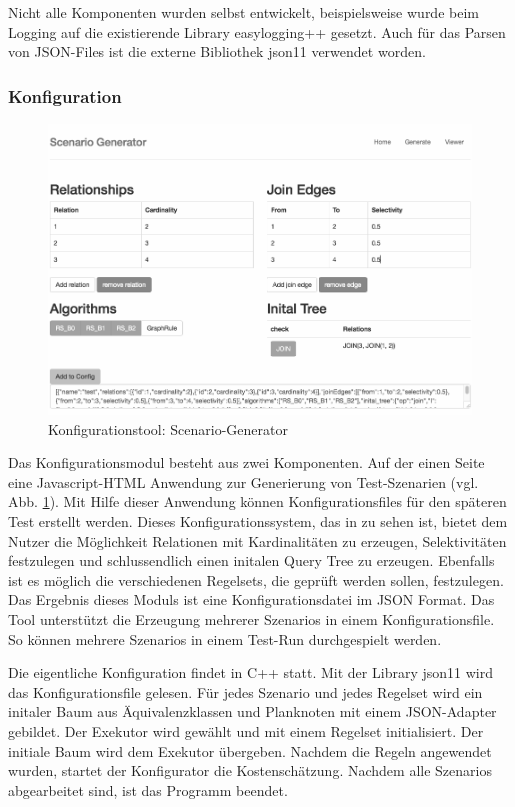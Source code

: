 Nicht alle Komponenten wurden selbst entwickelt, beispielsweise wurde beim Logging auf die existierende Library easylogging++ gesetzt. Auch für das Parsen von JSON-Files ist die externe Bibliothek json11 verwendet worden. 

\subsubsection{Konfiguration}


\begin{figure}[ht]
  \centering
  \includegraphics[width=1\textwidth]{04_Implementierung/Tool.png}
  \caption{Konfigurationstool: Scenario-Generator}
  \label{ScenarioGenerator}
\end{figure}

Das Konfigurationsmodul besteht aus zwei Komponenten. Auf der einen Seite eine Javascript-HTML Anwendung zur Generierung von Test-Szenarien (vgl. Abb. \ref{ScenarioGenerator}). Mit Hilfe dieser Anwendung können Konfigurationsfiles für den späteren Test erstellt werden. Dieses Konfigurationssystem, das in  zu sehen ist, bietet dem Nutzer die Möglichkeit Relationen mit Kardinalitäten zu erzeugen, Selektivitäten festzulegen und schlussendlich einen initalen Query Tree zu erzeugen. Ebenfalls ist es möglich die verschiedenen Regelsets, die geprüft werden sollen, festzulegen.
Das Ergebnis dieses Moduls ist eine Konfigurationsdatei im JSON Format. Das Tool unterstützt die Erzeugung mehrerer Szenarios in einem Konfigurationsfile. So können mehrere Szenarios in einem Test-Run durchgespielt werden.

Die eigentliche Konfiguration findet in C++ statt. Mit der Library json11 \cite{json11} wird das Konfigurationsfile gelesen. Für jedes Szenario und jedes Regelset wird ein initaler Baum aus Äquivalenzklassen und Planknoten mit einem JSON-Adapter gebildet. Der Exekutor wird gewählt und mit einem Regelset initialisiert. Der initiale Baum wird dem Exekutor übergeben. Nachdem die Regeln angewendet wurden, startet der Konfigurator die Kostenschätzung. Nachdem alle Szenarios abgearbeitet sind, ist das Programm beendet.

